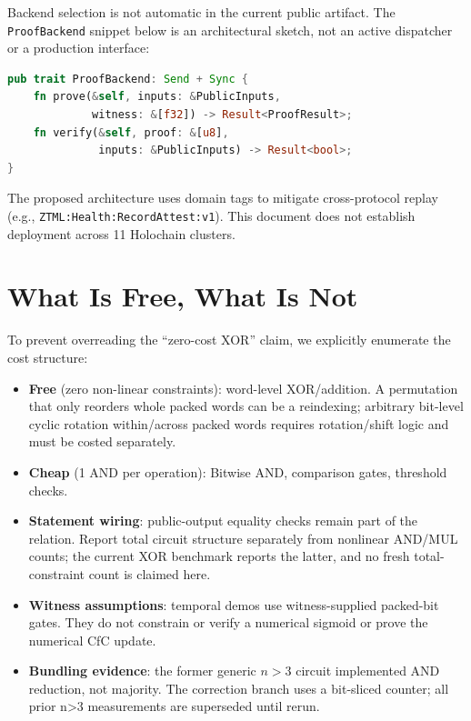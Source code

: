 \documentclass[11pt,twocolumn]{article}
\begin{document}
Backend selection is not automatic in the current public artifact. The \texttt{ProofBackend} snippet below is an architectural sketch, not an active dispatcher or a production interface:

\begin{lstlisting}[language=Rust,basicstyle=\small\ttfamily]
pub trait ProofBackend: Send + Sync {
    fn prove(&self, inputs: &PublicInputs,
             witness: &[f32]) -> Result<ProofResult>;
    fn verify(&self, proof: &[u8],
              inputs: &PublicInputs) -> Result<bool>;
}
\end{lstlisting}

The proposed architecture uses domain tags to mitigate cross-protocol replay (e.g., \texttt{ZTML:Health:RecordAttest:v1}). This document does not establish deployment across 11 Holochain clusters.

\section{What Is Free, What Is Not}
\label{sec:costs}

To prevent overreading the ``zero-cost XOR'' claim, we explicitly enumerate the cost structure:

\begin{itemize}
    \item \textbf{Free} (zero non-linear constraints): word-level XOR/addition. A permutation that only reorders whole packed words can be a reindexing; arbitrary bit-level cyclic rotation within/across packed words requires rotation/shift logic and must be costed separately.
    \item \textbf{Cheap} (1 AND per operation): Bitwise AND, comparison gates, threshold checks.
    \item \textbf{Statement wiring}: public-output equality checks remain part of the relation. Report total circuit structure separately from nonlinear AND/MUL counts; the current XOR benchmark reports the latter, and no fresh total-constraint count is claimed here.
    \item \textbf{Witness assumptions}: temporal demos use witness-supplied packed-bit gates. They do not constrain or verify a numerical sigmoid or prove the numerical CfC update.
    \item \textbf{Bundling evidence}: the former generic $n>3$ circuit implemented AND reduction, not majority. The correction branch uses a bit-sliced counter; all prior n>3 measurements are superseded until rerun.
\end{itemize}
\end{document}

